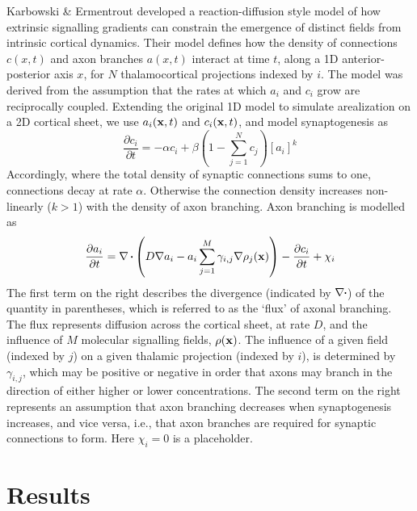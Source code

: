 \documentclass[9pt,twocolumn,twoside,lineno]{pnas-new}
\begin{document}
Karbowski \& Ermentrout \citep{karbowski_model_2004} developed a
reaction-diffusion style model of how extrinsic signalling gradients can
constrain the emergence of distinct fields from intrinsic cortical
dynamics. Their model defines how the density of connections $c(x,t)$ and axon
branches $a(x,t)$ interact at time $t$, along a 1D anterior-posterior axis
$x$, for $N$ thalamocortical projections indexed by $i$. The model was derived
from the assumption that the rates at which $a_i$ and $c_i$ grow are
reciprocally coupled. Extending the original 1D model to simulate arealization
on a 2D cortical sheet, we use $a_i(\mathbf{x},t)$ and $c_i(\mathbf{x},t)$, and model
synaptogenesis as
%
\begin{equation} \label{eq:dc}
\frac{\partial c_i}{\partial t} =-\alpha c_i +\beta  \left(1 - \sum_{j=1}^{N} c_{j}\right)[a_i]^k
\end{equation}
%
Accordingly, where the total density of synaptic connections sums to one,
connections decay at rate $\alpha$. Otherwise the connection density increases
non-linearly ($k>1$) with the density of axon branching. Axon branching is
modelled as
%
\begin{equation} \label{eq:da}
\frac{\partial a_i}{\partial t} = \nabla\vcdot\left(D \nabla a_i-a_i\sum_{j=1}^{M} \gamma_{i,j}\nabla \rho_j(\mb{x})\right) - \frac{\partial c_i}{\partial t} + \chi_i
\end{equation}
%
The first term on the right describes the divergence (indicated by
$\nabla\vcdot$) of the quantity in parentheses, which is referred to as the
`flux' of axonal branching. The flux represents diffusion across the cortical
sheet, at rate $D$, and the influence of $M$ molecular signalling fields,
$\rho(\mathbf{x})$. The influence of a given field (indexed by $j$) on a given
thalamic projection (indexed by $i$), is determined by $\gamma_{i,j}$, which
may be positive or negative in order that axons may branch in the direction of
either higher or lower concentrations. The second term on the right represents
an assumption that axon branching decreases when synaptogenesis increases, and
vice versa, i.e., that axon branches are required for synaptic connections to
form. Here $\chi_i=0$ is a placeholder.


\section*{Results}
\end{document}
